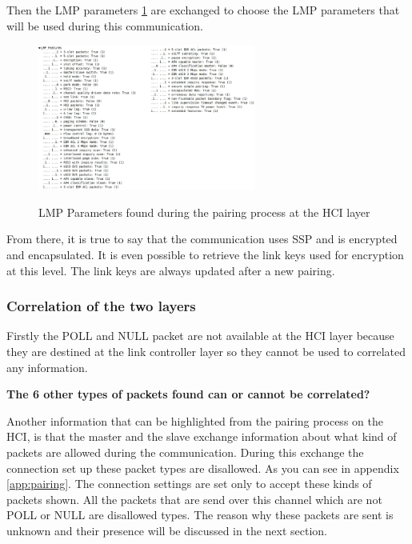 Then the LMP parameters \ref{fig:lmp} are exchanged to choose the LMP parameters that will be used during this communication. 
\begin{figure}[!h]
  \begin{center}
	\includegraphics[width=270px]{images/LMP_PARAM.jpg}
	\label{fig:lmp}
	\caption{LMP Parameters found during the pairing process at the HCI layer}
  \end{center}
\end{figure}

From there, it is true to say that the communication uses SSP and is encrypted and encapsulated. It is even possible to retrieve the link keys used for encryption at this level. The link keys are always updated after a new pairing.

\subsubsection{Correlation of the two layers}

Firstly the POLL and NULL packet are not available at the HCI layer because they are destined at the link controller layer so they cannot be used to correlated any information. 


\textbf{The 6 other types of packets found can or cannot be correlated?}

Another information that can be highlighted from the pairing process on the HCI, is that the master and the slave exchange information about what kind of packets are allowed during the communication. During this exchange the connection set up these packet types are disallowed. As you can see in appendix \ref{app:pairing}. The connection settings are set only to accept these kinds of packets shown. All the packets that are send over this channel which are not POLL or NULL are disallowed types. The reason why these packets are sent is unknown and their presence will be discussed in the next section.  \pend


